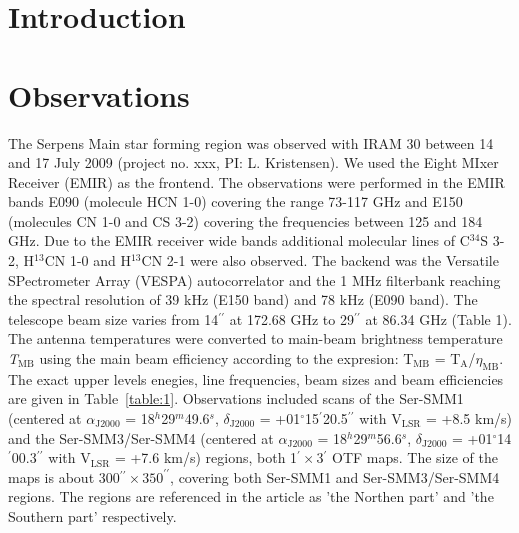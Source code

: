 \documentclass{aa}
\begin{document}

   \maketitle
%

\section{Introduction}


\section{Observations}
The Serpens Main star forming region was observed with IRAM 30 between 14 and 17 July 2009 (project no. xxx, PI: L. Kristensen). We used the Eight MIxer Receiver (EMIR) as the frontend. The observations were performed in the EMIR bands E090 (molecule HCN 1-0) covering the range 73-117 GHz and E150 (molecules CN 1-0 and CS 3-2) covering the frequencies between 125 and 184 GHz. Due to the EMIR receiver wide bands additional molecular lines of C$^{34}$S 3-2, H$^{13}$CN 1-0 and H$^{13}$CN 2-1 were also observed. The backend was the Versatile SPectrometer Array (VESPA) autocorrelator and the 1 MHz filterbank reaching the spectral resolution of 39 kHz (E150 band) and 78 kHz (E090 band). The telescope beam size varies from 14$^{\prime\prime}$ at 172.68 GHz to 29$^{\prime\prime}$ at 86.34 GHz (Table 1). The antenna temperatures were converted to main-beam brightness temperature \textit{T$_\mathrm{MB}$} using the main beam efficiency according to the expresion: T$_\mathrm{MB}$ = T$_\mathrm{A}$/$\eta_\mathrm{MB}$. The exact upper levels enegies, line frequencies, beam sizes and beam efficiencies are given in Table~\ref{table:1}. Observations included scans of the Ser-SMM1 (centered at $\alpha_\mathrm{J2000}$ = 18$^h$29$^m$49.6$^s$, $\delta_\mathrm{J2000}$ = +01$^{\circ}$15$^{\prime}$20.5$^{\prime\prime}$ with V$_\mathrm{LSR}$ = +8.5 km/s) and the Ser-SMM3/Ser-SMM4 (centered at $\alpha_\mathrm{J2000}$ = 18$^h$29$^m$56.6$^s$, $\delta_\mathrm{J2000}$ = +01$^{\circ}$14$^{\prime}$00.3$^{\prime\prime}$ with V$_\mathrm{LSR}$ = +7.6 km/s) regions, both 1$^{\prime}\times$3$^{\prime}$ OTF maps. The size of the maps is about 300$^{\prime\prime}\times350^{\prime\prime}$, covering both Ser-SMM1 and Ser-SMM3/Ser-SMM4 regions. The regions are referenced in the article as 'the Northen part' and 'the Southern part' respectively. 
\end{document}
